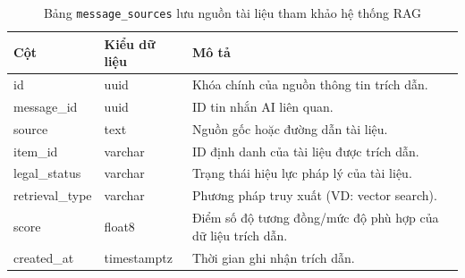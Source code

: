 \begin{table}[H]
\centering
\begin{tabular}{|l|l|p{6cm}|}
\hline
\textbf{Cột} & \textbf{Kiểu dữ liệu} & \textbf{Mô tả} \\ \hline
id & uuid & Khóa chính của nguồn thông tin trích dẫn. \\ \hline
message\_id & uuid & ID tin nhắn AI liên quan. \\ \hline
source & text & Nguồn gốc hoặc đường dẫn tài liệu. \\ \hline
item\_id & varchar & ID định danh của tài liệu được trích dẫn. \\ \hline
legal\_status & varchar & Trạng thái hiệu lực pháp lý của tài liệu. \\ \hline
retrieval\_type & varchar & Phương pháp truy xuất (VD: vector search). \\ \hline
score & float8 & Điểm số độ tương đồng/mức độ phù hợp của dữ liệu trích dẫn. \\ \hline
created\_at & timestamptz & Thời gian ghi nhận trích dẫn. \\ \hline
\end{tabular}
\caption{Bảng \texttt{message\_sources} lưu nguồn tài liệu tham khảo hệ thống RAG}
\end{table}

